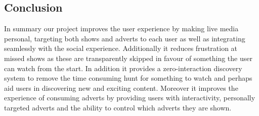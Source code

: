 	\subsection{Conclusion}
In summary our project improves the user experience by making live media personal, targeting both shows and adverts to each user as well as integrating seamlessly with the social experience. Additionally it reduces frustration at missed shows as these are transparently skipped in favour of something the user can watch from the start. In addition it provides a zero-interaction discovery system to remove the time consuming hunt for something to watch and perhaps aid users in discovering new and exciting content. Moreover it improves the experience of consuming adverts by providing users with interactivity, personally targeted adverts and the ability to control which adverts they are shown. 
